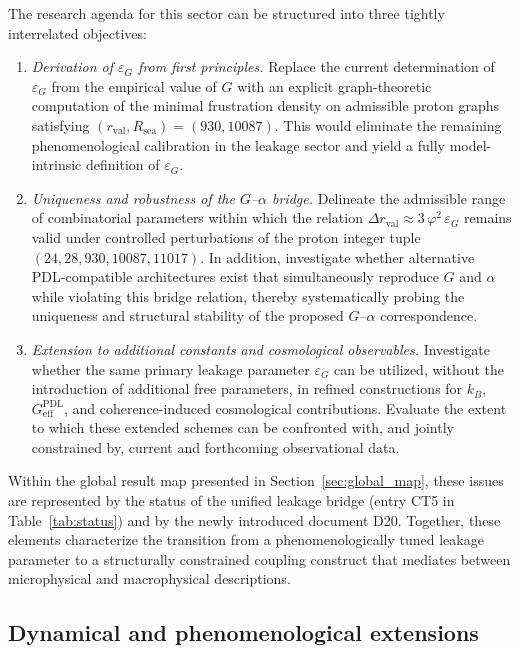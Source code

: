 \documentclass{article}
\newcommand{\PDL}{\mathrm{PDL}}
\begin{document}
The research agenda for this sector can be structured into three tightly interrelated objectives:
\begin{enumerate}[label=(\roman*), leftmargin=*]
  \item \emph{Derivation of $\varepsilon_G$ from first principles.}  Replace the current determination of $\varepsilon_G$ from the empirical value of $G$ with an explicit graph-theoretic computation of the minimal frustration density on admissible proton graphs satisfying $(r_{\mathrm{val}},R_{\mathrm{sea}})=(930,10087)$. This would eliminate the remaining phenomenological calibration in the leakage sector and yield a fully model-intrinsic definition of $\varepsilon_G$.
  \item \emph{Uniqueness and robustness of the $G$--$\alpha$ bridge.}  Delineate the admissible range of combinatorial parameters within which the relation $\Delta r_{\mathrm{val}} \approx 3\,\varphi^2\,\varepsilon_G$ remains valid under controlled perturbations of the proton integer tuple $(24,28,930,10087,11017)$. In addition, investigate whether alternative PDL-compatible architectures exist that simultaneously reproduce $G$ and $\alpha$ while violating this bridge relation, thereby systematically probing the uniqueness and structural stability of the proposed $G$--$\alpha$ correspondence.
  \item \emph{Extension to additional constants and cosmological observables.}  Investigate whether the same primary leakage parameter $\varepsilon_G$ can be utilized, without the introduction of additional free parameters, in refined constructions for $k_B$, $G_{\mathrm{eff}}^{\PDL}$, and coherence-induced cosmological contributions. Evaluate the extent to which these extended schemes can be confronted with, and jointly constrained by, current and forthcoming observational data.
\end{enumerate}
Within the global result map presented in Section~\ref{sec:global_map}, these issues are represented by the status of the unified leakage bridge (entry CT5 in Table~\ref{tab:status}) and by the newly introduced document D20. Together, these elements characterize the transition from a phenomenologically tuned leakage parameter to a structurally constrained coupling construct that mediates between microphysical and macrophysical descriptions.


\subsection{Dynamical and phenomenological extensions}
\label{subsec:roadmap_dynamical}
\end{document}
